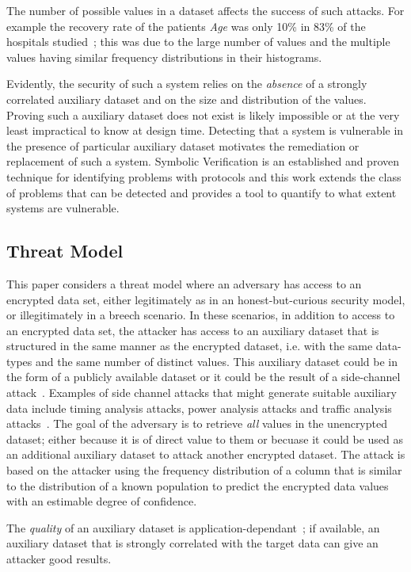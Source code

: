 \documentclass[journal]{IEEEtran}
\begin{document}
The number of possible values in a dataset affects the success of such attacks. For example the recovery rate of the patients \textit{Age} was only 10\% in 83\% of the hospitals studied~\cite{InfrenceAttacks}; this was due to the large number of values and the multiple values having similar frequency distributions in their histograms.

Evidently, the security of such a system relies on the \textit{absence} of a strongly correlated auxiliary dataset and on the size and distribution of the values. 
Proving such a auxiliary dataset does not exist is likely impossible or at the very least impractical to know at design time.  Detecting that a system is vulnerable in the presence of particular auxiliary dataset motivates the remediation or replacement of such a system.
Symbolic Verification is an established and proven technique for identifying problems with protocols and this work extends the class of problems that can be detected and provides a tool to quantify to what extent systems are vulnerable.


\subsection{Threat Model}
This paper considers a threat model where an adversary has access to an encrypted data set, either legitimately as in an honest-but-curious security model, or illegitimately in a breech scenario. 
In these scenarios, in addition to access to an encrypted data set, the attacker has access to an auxiliary dataset that is structured in the same manner as the encrypted dataset, i.e. with the same data-types and the same number of distinct values. This auxiliary dataset could be in the form of a publicly available dataset or it could be the result of a side-channel attack~\cite{Kocher96}. Examples of side channel attacks that might generate suitable auxiliary data include timing analysis attacks, power analysis attacks and traffic analysis attacks~\cite{SideChannelSurvey}.
The goal of the adversary is to retrieve \textit{all} values in the unencrypted dataset; either because it is of direct value to them or becuase it could be used as an additional auxiliary dataset to attack another encrypted dataset. 
The attack is based on the attacker using the frequency distribution of a column that is similar to the distribution of a known population to predict the encrypted data values with an estimable degree of confidence.

The \textit{quality} of an auxiliary dataset is application-dependant~\cite{InfrenceAttacks}; if available, an auxiliary dataset that is strongly correlated with the target data can give an attacker good results.
\end{document}
